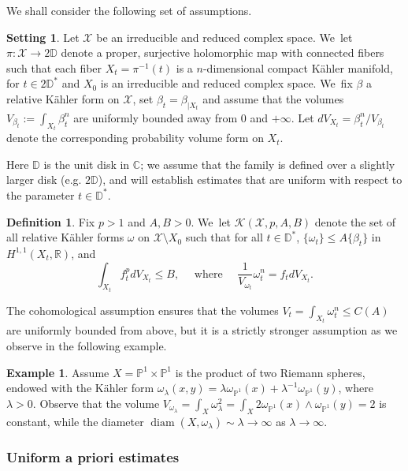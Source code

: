 \documentclass[10pt]{amsart}
\DeclareMathOperator{\diam}{diam}
\theoremstyle{definition}
\newtheorem{setting}[theorem]{Setting}
\newtheorem{defi}[theorem]{Definition}
\newtheorem{exa}[theorem]{Example}
\newcommand{\C}{\mathbb C}
\newcommand{\PP}{\mathbb P}
\newcommand{\R}{\mathbb R}
\begin{document}
We shall consider the following set of assumptions.

\begin{setting} \label{set}
Let $\mathcal{X}$ be an irreducible and reduced complex space. We~let $\pi:{\mathcal X} \rightarrow 2 \mathbb D$
denote a proper, surjective holomorphic map with connected fibers such that each fiber $X_t=\pi^{-1}(t)$ is a $n$-dimensional
compact Kähler manifold, for $t\in 2 \mathbb D^*$ and $X_0$ is an irreducible and reduced complex space. We~fix $\beta$ a relative Kähler form on $\mathcal{X}$, set $\beta_t=\beta_{|X_t}$ and assume that the volumes $V_{\beta_t}:=\int_{X_t} \beta_t^n$ are uniformly bounded away from 0 and $+ \infty $. Let $dV_{X_t}=\beta_t^n /V_{\beta_t}$ denote the corresponding probability volume form on $X_t$.
\end{setting}

Here $\mathbb D$ is the unit disk in $\C$; we assume that the family is defined over a slightly larger disk
(e.g. $2 \mathbb D$), and will establish estimates that are uniform with respect to the parameter $t \in \mathbb D^*$.

\begin{defi}
Fix $p>1$ and $A,B>0$. We~let ${\mathcal K}(\mathcal{X},p,A,B)$ denote the set of all relative Kähler forms $\omega$ on
$\mathcal{X}\setminus X_0$ such that for all $t \in \mathbb D^*$, $\{\omega_t\}\leq A\{\beta_t\}$ in $H^{1,1}(X_t,\R)$, and
\[
\int_{X_t} f_t^p dV_{X_t} \leq B,
\quad \text{ where } \quad
\frac{1}{V_{\omega_t}} \omega_t^n=f_t dV_{X_t}.
\]
\end{defi}

The cohomological assumption
ensures that the volumes $V_t=\int_{X_t} \omega_t^n \leq C(A)$ are uniformly bounded from above,
but it is a strictly stronger assumption as we observe in the following example.

\begin{exa} \label{exa:voldiam}
Assume ${X}=\PP^1 \times \PP^1$ is the product of two Riemann spheres, endowed with the
Kähler form $\omega_{\lambda}(x,y)=\lambda \omega_{\PP^1}(x)+\lambda^{-1} \omega_{\PP^1}(y)$,
where $\lambda>0$. Observe that the volume
$
V_{\omega_{\lambda}}=\int_X \omega_{\lambda}^2=\int_X 2 \omega_{\PP^1}(x) \wedge \omega_{\PP^1}(y)=2
$
is constant, while the diameter
$\diam(X,\omega_{\lambda}) \sim \lambda \rightarrow \infty$ as $\lambda \rightarrow \infty$.
\end{exa}

\subsubsection{Uniform a priori estimates}
\end{document}
